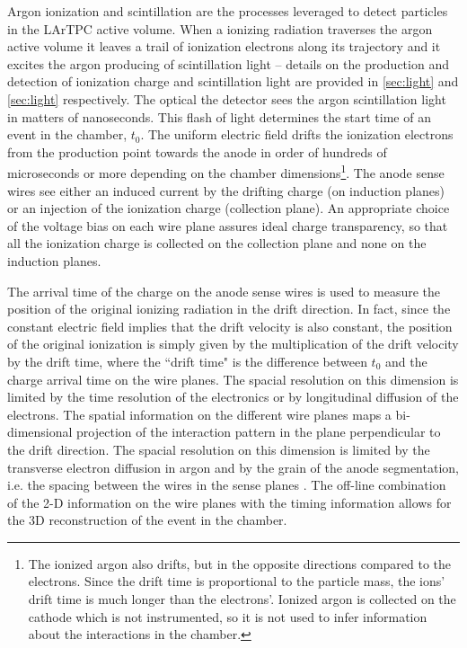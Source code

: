 Argon ionization and scintillation are the processes leveraged to detect particles in the LArTPC active volume.  When a ionizing radiation traverses the argon active volume it leaves a trail of ionization electrons along its trajectory and it excites the argon producing of scintillation light -- details on the production and detection of ionization charge and scintillation light are provided in \ref{sec:light} and \ref{sec:light} respectively. The optical the detector sees the argon scintillation light in matters of nanoseconds. This flash of light determines the start time of an event in the chamber, $t_0$. The uniform electric field drifts the ionization  electrons from the production point towards the anode in order of hundreds of microseconds or more depending on the chamber dimensions\footnote{The ionized argon also drifts, but  in the opposite directions compared to the electrons. Since the drift time is proportional to the particle mass,  the ions' drift time is much longer than the electrons'.  Ionized argon is collected on the cathode which is not instrumented, so it is not used to infer information about the interactions in the chamber.}. The anode sense wires see either an induced current by the drifting charge (on induction planes) or an injection of the ionization charge (collection plane).    An appropriate choice of the voltage bias on each wire plane assures ideal charge transparency, so that all the ionization charge is collected on the collection plane and none on the induction planes.  

The arrival time of the charge on the anode sense wires is used to measure the position of the original ionizing radiation in the drift direction. In fact, since the constant electric field implies that the drift velocity is also constant, the position of the original ionization is simply given by the multiplication of the drift velocity by the drift time, where the ``drift time" is the difference between $t_0$ and the charge arrival time on the wire planes. The spacial resolution on this dimension is limited by the time resolution of the electronics or by longitudinal diffusion of the electrons.
The spatial information on the different wire planes maps a bi-dimensional projection of the interaction pattern in the plane perpendicular to the drift direction. The spacial resolution on this dimension is limited by the transverse electron diffusion in argon and by the grain of the anode segmentation, i.e. the spacing between the wires in the sense planes \cite{DERENZO1974319}.  The off-line combination of the 2-D information on the wire planes with the timing information allows for the 3D reconstruction of the event in the chamber.

